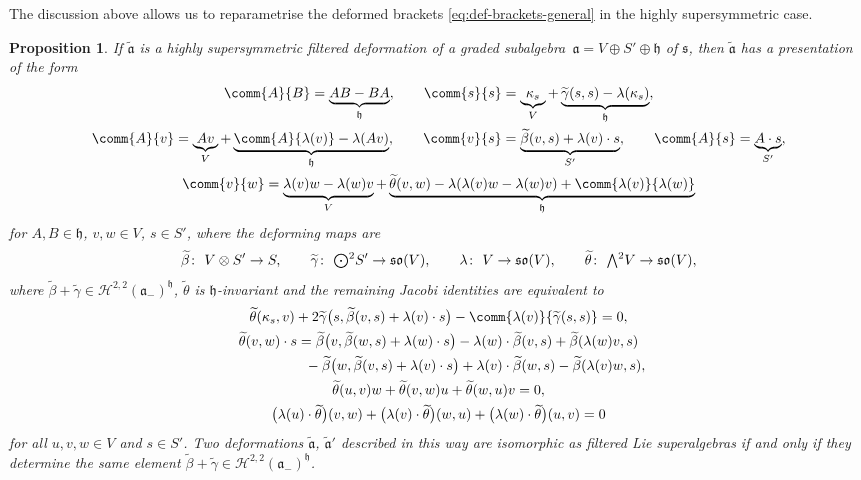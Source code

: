 \documentclass[10pt,a4paper]{amsart}
\numberwithin{equation}{section}
\newtheorem{Proposition}[Theorem]{Proposition}
 { \theoremstyle{definition}
\newtheorem{Definition}[Theorem]{Definition}
\newtheorem{Note}[Theorem]{Note}
\newtheorem{Example}[Theorem]{Example}
\newtheorem{Remark}[Theorem]{Remark} }
\newcommand{\fa}{\mathfrak{a}}
\newcommand{\fh}{\mathfrak{h}}
\newcommand{\fs}{\mathfrak{s}}
\newcommand{\fso}{\mathfrak{so}}
\newcommand{\cH}{\mathcal{H}}
\newcommand{\betatilde}{\widetilde{\beta}}
\newcommand{\gammatilde}{\widetilde{\gamma}}
\newcommand{\thetatilde}{\widetilde{\theta}}
\newcommand{\fatilde}{\widetilde{\fa}}
\newcommand{\Wedge}{\mathchoice{{\textstyle\bigwedge}}{\bigwedge}{\bigwedge}{\bigwedge}}	%
\newcommand{\Odot}{\mathchoice{{\textstyle\bigodot}}{\bigodot}{\bigodot}{\bigodot}}
\newcommand{\1}{\mathbbm{1}}
\begin{document}
The discussion above allows us to reparametrise the deformed brackets \eqref{eq:def-brackets-general} in the highly supersymmetric case.

\begin{Proposition}\label{prop:filtered-def-high-susy}
	If $\fatilde$ is a highly supersymmetric filtered deformation of a graded subalgebra~${\fa=V\oplus S'\oplus \fh}$ of $\fs$, then $\fatilde$ has a presentation of the form
	\begin{gather}
		\comm{A}{B} = \underbrace{AB-BA}_\fh,\qquad
		\comm{s}{s} = \underbrace{\kappa_s}_V + \underbrace{\gammatilde(s,s) - \lambda(\kappa_s)}_\fh,\nonumber\\
		\comm{A}{v} = \underbrace{Av}_V + \underbrace{\comm{A}{\lambda(v)} - \lambda(Av)}_\fh,\qquad
		\comm{v}{s} = \underbrace{\betatilde(v,s) + \lambda(v)\cdot s}_{S'},\qquad
		\comm{A}{s} = \underbrace{A\cdot s}_{S'},\nonumber
	\\
		\comm{v}{w} = \underbrace{\lambda(v)w-\lambda(w)v}_V + \underbrace{\thetatilde(v,w) - \lambda(\lambda(v)w-\lambda(w)v) + \comm{\lambda(v)}{\lambda(w)}}_\fh\label{eq:def-brackets-V}
	\end{gather}
	for $A,B\in\fh$, $v,w\in V$, $s\in S'$, where the deforming maps are
	\[
\betatilde\colon\ V\otimes S' \to S,\qquad
		\gammatilde\colon\ \Odot^2 S' \to \fso(V),\qquad
		\lambda\colon\ V\to\fso(V),\qquad
		\thetatilde\colon\ \Wedge^2 V \to \fso(V),
	\]
	where $\betatilde+\gammatilde\in\cH^{2,2}(\fa_-)^\fh$, $\thetatilde$ is $\fh$-invariant and the remaining Jacobi identities are equivalent to
	\begin{gather}
		\thetatilde(\kappa_s,v) + 2\gammatilde\bigl(s,\betatilde(v,s)+\lambda(v)\cdot s\bigr) - \comm{\lambda(v)}{\gammatilde(s,s)} = 0, \label{eq:tilde-theta-kappa}\\
		\thetatilde(v,w)\cdot s
		= \betatilde\bigl(v,\betatilde(w,s)+\lambda(w)\cdot s\bigr)
			- \lambda(w)\cdot \betatilde(v,s) + \betatilde(\lambda(w)v,s)\nonumber\\
			\phantom{\thetatilde(v,w)\cdot s
		=}{} - \betatilde\bigl(w,\betatilde(v,s)+\lambda(v)\cdot s\bigr)
			+ \lambda(v)\cdot \betatilde(w,s) - \betatilde(\lambda(v)w,s),\label{eq:tilde-theta-lambda}\\
		\thetatilde(u,v)w + \thetatilde(v,w)u + \thetatilde(w,u)v =0,\label{eq:tilde-theta-bianchi}\\
		\bigl(\lambda(u)\cdot\thetatilde\bigr)(v,w) + \bigl(\lambda(v)\cdot\thetatilde\bigr)(w,u) +			\bigl(\lambda(w)\cdot\thetatilde\bigr)(u,v) = 0 \label{eq:tilde-theta-lambda-bianchi}
	\end{gather}
	for all $u,v,w\in V$ and $s\in S'$.
	Two deformations $\fatilde$, $\fatilde'$ described in this way are isomorphic as filtered Lie superalgebras if and only if they determine the same element $\betatilde+\gammatilde\in\cH^{2,2}(\fa_-)^\fh$.
\end{Proposition}
\end{document}
